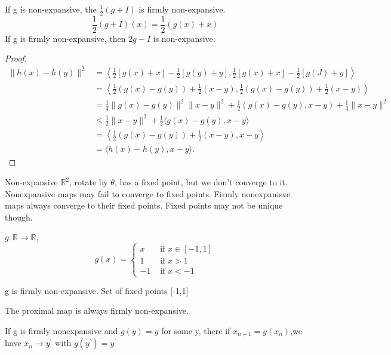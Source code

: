 \begin{lemma}
	If g is non-expansive, the $ \frac{1}{2}(g+I) $ is 	firmly non-expansive.
	$$
	\frac{1}{2}(g+I)(x)=\frac{1}{2}(g(x)+x)
	$$
	If g is firmly non-expansive, then $ 2g-I $ is non-expansive.
\end{lemma}

\begin{proof}
	$$
	\begin{aligned}
	\|h(x)-h(y)\|^{2}&=\left\langle\frac{1}{2}[g(x)+x]-\frac{1}{2}[g(y)+y], \frac{1}{2}[g(x)+x]-\frac{1}{2}[g(J)+y]\right\rangle\\
	&=\left\langle\frac{1}{2}(g(x)-g(y))+\frac{1}{2}(x-y), \frac{1}{2}(g(x)-g(y))+\frac{1}{2}(x-y)\right\rangle \\
	&=\frac{1}{4} \|g(x)-g(y)\|^{2}\|x-y\|^{2}+\frac{1}{2}(g(x)-g(y), x-y)+\frac{1}{4}\|x-y\|^{2} \\
	& \leqslant \frac{1}{2}\|x-y\|^{2}+\frac{1}{2}\langle g(x)-g(y), x-y\rangle \\
	&=\left\langle\frac{1}{2}(g(x)-g(y))+\frac{1}{2}(x-y), x-y\right\rangle\\
	&=\langle h(x)-h(y), x-y\rangle .
	\end{aligned}
	$$	
	\end{proof}

\begin{example}
	Non-expansive $ \mathbb{R}^{2}  $, rotate by $ \theta $, has a fixed point, but we don't converge to it.
	Nonexpansive maps may fail to converge to fixed points. Firmly nonexpanisve maps always converge to their fixed points.
	Fixed points may not be unique though.
	\end{example}

\begin{example}
	$ g: \mathbb{R} \rightarrow \mathbb{R}$, 
	$$  g(x)=\left\{\begin{array}{cl}
	x & \text { if } x\in [-1,1] \\
	1 & \text { if }  x > 1    \\
	-1 & \text { if } x <-1
	\end{array}\right.$$
	\end{example}
g is firmly non-expansive. Set of fixed points [-1,1]
\begin{theorem}
The proximal map is always firmly non-expansive.	
	\end{theorem}
\begin{theorem}
If g is firmly nonexpansive and $ g(y)=y $	for some y, there if $ x_{n+1}=g(x_{n}) $,we have $ x_{n} \rightarrow y^{\prime} $ with $ g(y^{\prime})=y^{\prime} $
\end{theorem}

